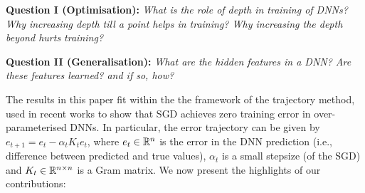 \documentclass{article}
\begin{document}
\textbf{Question I (Optimisation):} \emph{What is the role of depth in training of DNNs? Why increasing depth till a point helps in training? Why increasing the depth beyond hurts training?}\\
\begin{comment}We call the above  questions are the depth phenomena. \cite{dudnn} show that, when it comes to training, residual networks are better than simple FC-DNNs. However, the depth phenomena in the case of simple FC-DNNs is still unresolved.
\end{comment}
\textbf{Question II (Generalisation):} \emph{What are the hidden features in a DNN? Are these features learned? and if so, how?}
\begin{comment}The general consensus is that, the DNNs learn hidden representations progressively in each of the intermediate layers, and the final layer learns a linear model using features obtained in the penultimate layer.  This view, while conceptually simple, however, does not provide us any analytical insight regarding the above question.  A more analytically appealing candidate for the hidden representation (used in some of the recent works \cite{}) is the \emph{neural tangent random feature} (NTRF) which is the NTF evaluated at randomised initialisation of an infinitely wide DNN. \cite{} provides generalisation bounds in terms of the Rademacher complexity of the class of functions defined by the NTRF and also in terms of an associated neural tangent kernel (NTK). \cite{} uses NTK to set a significant new benchmark for pure-kernel based learning.  An issue with the NTRF/NTK approach is that the features do not change over the training of the DNN, thus implying no feature learning is happening, and yet experimental evidence (in \cite{} as well as \Cref{sec:generalisation-exp}) shows that DNNs perform significantly better than pure-kernel learning with NTK.
\end{comment}

The results in this paper fit within the the framework of the trajectory method, used in recent works \cite{} to show that SGD achieves zero training error in over-parameterised DNNs. In particular, the error trajectory can be given by $e_{t+1}=e_t-\alpha_tK_te_t$, where $e_t\in \mathbb{R}^n$ is the error in the DNN prediction (i.e., difference between predicted and true values), $\alpha_t$ is a small stepsize (of the SGD) and $K_t\in\mathbb{R}^{n\times n}$ is a Gram matrix. We now present the highlights of our contributions:
\end{document}
